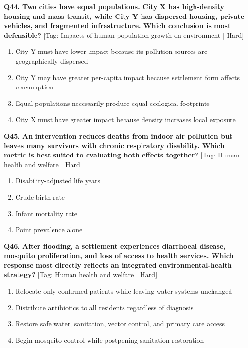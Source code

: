 \noindent\textbf{Q44. Two cities have equal populations. City X has high-density housing and mass transit, while City Y has dispersed housing, private vehicles, and fragmented infrastructure. Which conclusion is most defensible?} \hfill [Tag: Impacts of human population growth on environment | Hard]
\begin{enumerate}[label=(\alph*),topsep=2pt,itemsep=1pt,partopsep=0pt,parsep=0pt]
    \item {City Y must have lower impact because its pollution sources are geographically dispersed}
    \item {City Y may have greater per-capita impact because settlement form affects consumption}
    \item {Equal populations necessarily produce equal ecological footprints}
    \item {City X must have greater impact because density increases local exposure}
\end{enumerate}
\vspace{2mm}

\noindent\textbf{Q45. An intervention reduces deaths from indoor air pollution but leaves many survivors with chronic respiratory disability. Which metric is best suited to evaluating both effects together?} \hfill [Tag: Human health and welfare | Hard]
\begin{enumerate}[label=(\alph*),topsep=2pt,itemsep=1pt,partopsep=0pt,parsep=0pt]
    \item {Disability-adjusted life years}
    \item {Crude birth rate}
    \item {Infant mortality rate}
    \item {Point prevalence alone}
\end{enumerate}
\vspace{2mm}

\noindent\textbf{Q46. After flooding, a settlement experiences diarrhoeal disease, mosquito proliferation, and loss of access to health services. Which response most directly reflects an integrated environmental-health strategy?} \hfill [Tag: Human health and welfare | Hard]
\begin{enumerate}[label=(\alph*),topsep=2pt,itemsep=1pt,partopsep=0pt,parsep=0pt]
    \item {Relocate only confirmed patients while leaving water systems unchanged}
    \item {Distribute antibiotics to all residents regardless of diagnosis}
    \item {Restore safe water, sanitation, vector control, and primary care access}
    \item {Begin mosquito control while postponing sanitation restoration}
\end{enumerate}
\vspace{2mm}

